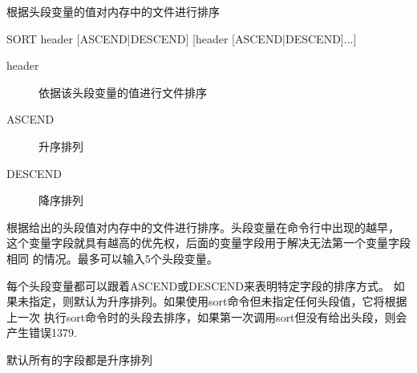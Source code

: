 \label{cmd:sort}

根据头段变量的值对内存中的文件进行排序

\begin{SACSTX}
SORT header [ASCEND|DESCEND] [header [ASCEND|DESCEND]...]
\end{SACSTX}

\begin{description}
\item [header] 依据该头段变量的值进行文件排序
\item [ASCEND] 升序排列
\item [DESCEND] 降序排列
\end{description}

根据给出的头段值对内存中的文件进行排序。头段变量在命令行中出现的越早，
这个变量字段就具有越高的优先权，后面的变量字段用于解决无法第一个变量字段相同
的情况。最多可以输入5个头段变量。

每个头段变量都可以跟着ASCEND或DESCEND来表明特定字段的排序方式。
如果未指定，则默认为升序排列。如果使用sort命令但未指定任何头段值，它将根据上一次
执行sort命令时的头段去排序，如果第一次调用sort但没有给出头段，则会产生错误1379.

默认所有的字段都是升序排列

